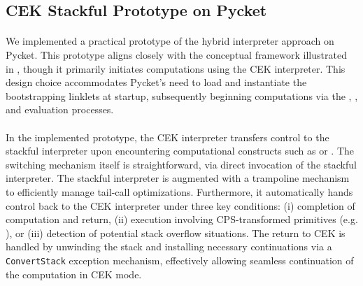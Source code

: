     \subsection{CEK \+ Stackful Prototype on Pycket}


      \paragraph{}%
        We implemented a practical prototype of the hybrid interpreter approach on Pycket. This prototype aligns closely with the conceptual framework illustrated in , though it primarily initiates computations using the CEK interpreter. This design choice accommodates Pycket's need to load and instantiate the bootstrapping linklets at startup, subsequently beginning computations via the , , and evaluation processes.

      \paragraph{}%
        In the implemented prototype, the CEK interpreter transfers control to the stackful interpreter upon encountering computational constructs such as  or . The switching mechanism itself is straightforward, via direct invocation of the stackful interpreter. The stackful interpreter is augmented with a trampoline mechanism to efficiently manage tail-call optimizations. Furthermore, it automatically hands control back to the CEK interpreter under three key conditions: (i) completion of computation and return, (ii) execution involving CPS-transformed primitives (e.g. ), or (iii) detection of potential stack overflow situations. The return to CEK is handled by unwinding the stack and installing necessary continuations via a \verb|ConvertStack| exception mechanism, effectively allowing seamless continuation of the computation in CEK mode.

